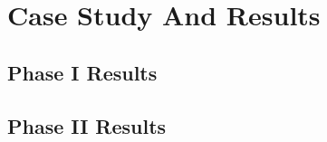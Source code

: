 \chapter{Case Study And Results}\label{chapter:results}

\section{Phase I Results}
\section{Phase II Results}
